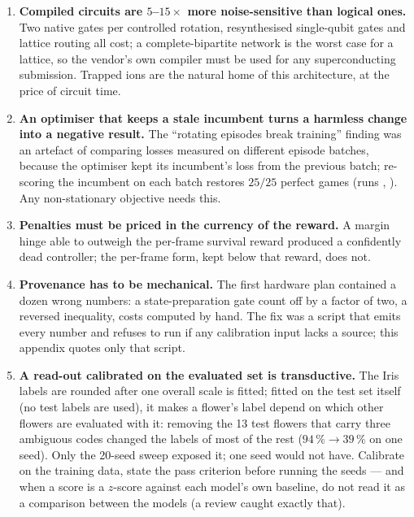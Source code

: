 \begin{enumerate}
\item \textbf{Compiled circuits are $5$--$15\times$ more noise-sensitive than logical ones.}
Two native gates per controlled rotation, resynthesised single-qubit gates and lattice routing
all cost; a complete-bipartite network is the worst case for a lattice, so the vendor's own
compiler must be used for any superconducting submission.  Trapped ions are the natural home of
this architecture, at the price of circuit time.

\item \textbf{An optimiser that keeps a stale incumbent turns a harmless change into a negative
result.}  The ``rotating episodes break training'' finding was an artefact of comparing losses
measured on different episode batches, because the optimiser kept its incumbent's loss from the
previous batch; re-scoring the incumbent on each batch restores $25/25$ perfect games (runs
, ).  Any non-stationary objective needs this.

\item \textbf{Penalties must be priced in the currency of the reward.}  A margin hinge able to
outweigh the per-frame survival reward produced a confidently dead controller; the per-frame
form, kept below that reward, does not.

\item \textbf{Provenance has to be mechanical.}  The first hardware plan contained a dozen wrong
numbers: a state-preparation gate count off by a factor of two, a reversed inequality, costs
computed by hand.  The fix was a script that emits every number and refuses to run if any
calibration input lacks a source; this appendix quotes only that script.

\item \textbf{A read-out calibrated on the evaluated set is transductive.}  The Iris labels are
rounded after one overall scale is fitted; fitted on the test set itself (no test labels are
used), it makes a flower's label depend on which other flowers are evaluated with it: removing
the 13 test flowers that carry three ambiguous codes changed the labels of most of the rest
($94\,\% \to 39\,\%$ on one seed).  Only the 20-seed sweep exposed it; one seed would not have.
Calibrate on the training data, state the pass criterion before running the seeds --- and when a
score is a $z$-score against each model's own baseline, do not read it as a comparison between
the models (a review caught exactly that).
\end{enumerate}


